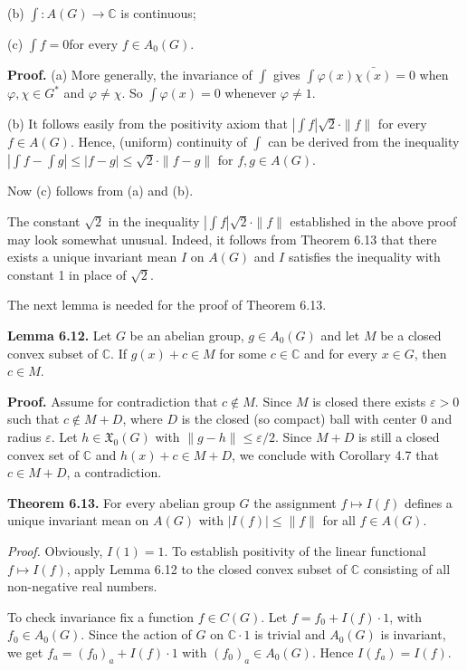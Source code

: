\documentclass[12pt]{article}
\begin{document}
(b) $\int : A(G) \to \mathbb{C}$ is continuous;

(c) $\int f = 0 $for every $f \in A_0(G)$.


\textbf{Proof.} (a) More generally, the invariance of $\int$ gives $\int \varphi(x) \bar{\chi(x)} = 0$ when $\varphi,\chi \in G^*$ and $\varphi \neq \chi$. So $\int \varphi(x) = 0$ whenever
$\varphi \neq 1$.


    (b) It follows easily from the positivity axiom that $|\int f |  \sqrt{2} \cdot \| f \|$ for every $f \in A(G)$. Hence, (uniform) continuity of $\int$
can be derived from the inequality $| \int f - \int g| \leqslant |f - g| \leqslant \sqrt{2} \cdot \| f - g\|$ for $f , g \in A(G)$.


    Now (c) follows from (a) and (b). 


The constant $\sqrt{2}$ in the inequality $|\int f |  \sqrt{2} \cdot \| f \|$ established in the above proof may look somewhat unusual. Indeed, it
follows from Theorem 6.13 that there exists a unique invariant mean $I$ on $A(G)$ and $I$ satisfies the inequality with constant 1
in place of $\sqrt{2}$.


    The next lemma is needed for the proof of Theorem 6.13.


\textbf{Lemma 6.12.} Let $G$ be an abelian group, $g \in A_0(G)$ and let $M$ be a closed convex subset of $\mathbb{C}$. If $g(x) + c \in M$ for some $c \in \mathbb{C}$ and for
every $x \in G$, then $c \in M$.


\textbf{Proof.} Assume for contradiction that $c \notin M$. Since $M$ is closed there exists $\varepsilon > 0$ such that $c \notin M + D$, where $D$ is the closed
(so compact) ball with center 0 and radius $\varepsilon$. Let $h \in \mathfrak{X}_0(G)$ with $\|g - h\| \leqslant \varepsilon/2$. Since $M + D$ is still a closed convex set
of $\mathbb{C}$ and $h(x) + c \in M + D$, we conclude with Corollary 4.7 that $c \in M + D$, a contradiction. 


\textbf{Theorem 6.13.} For every abelian group $G$ the assignment $f \mapsto I(f )$ defines a unique invariant mean on $A(G)$ with $|I(f )| \leqslant \| f \|$ for
all $f \in A(G)$.


\emph{Proof.} Obviously, $I(1) = 1$. To establish positivity of the linear functional $f \mapsto I(f )$, apply Lemma 6.12 to the closed convex
subset of $\mathbb{C}$ consisting of all non-negative real numbers.


    To check invariance fix a function $f \in C(G)$. Let $f = f_0 + I(f )\cdot 1$, with $f_0 \in A_0(G)$. Since the action of $G$ on $\mathbb{C} \cdot 1$ is trivial
and $A_0(G)$ is invariant, we get $f_a = (f_0)_a + I(f ) \cdot 1$ with $(f_0)_a \in A_0(G)$. Hence $I(f_a) = I(f )$.
\end{document}
